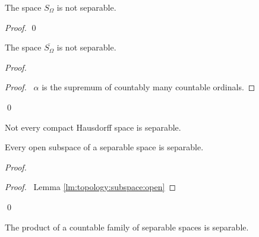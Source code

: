   \begin{prop}
    \label{prop:topology:separable:S_omega}
 The space $S_\Omega$ is not separable.
\end{prop}

\begin{proof}
 \pf
 \step{<1>3}{$\overline{D} \subseteq (-\infty, \alpha]$}
 \qed
\end{proof}

  \begin{prop}
  The space $\overline{S_\Omega}$ is not separable.
\end{prop}

\begin{proof}
 \pf
 \begin{proof}
   \pf\ $\alpha$ is the supremum of countably many countable ordinals.
 \end{proof}
 \step{<1>4}{$\overline{D} \subseteq (-\infty, \alpha] \cup \{ \Omega \}$}
 \qed
\end{proof}

\begin{cor}
  Not every compact Hausdorff space is separable.
\end{cor}

\begin{prop}
  Every open subspace of a separable space is separable.
\end{prop}

\begin{proof}
  \pf
  \begin{proof}
    \pf\ Lemma \ref{lm:topology:subspace:open}
  \end{proof}
  \qed
\end{proof}

\begin{prop}[CC]
 The product of a countable family of separable spaces is separable.
\end{prop}

